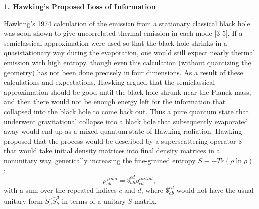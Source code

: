 \vspace{5 mm}
{\bf 1.  Hawking's Proposed Loss of Information}
\vspace{5 mm}

     Hawking's 1974 calculation \cite{Haw74,Haw75} of the emission
from a
stationary classical black hole was soon shown to give uncorrelated
thermal
emission in each mode [3-5].  If a semiclassical
approximation were used so that the black hole shrinks in a
quasistationary way
during the evaporation, one would still expect nearly thermal
emission with
high entropy, though even this calculation (without quantizing the
geometry)
has not been done precisely in four dimensions.  As a result of these
calculations and
expectations, Hawking argued \cite{Haw76} that the semiclassical
approximation
should be good until the black hole shrunk near the Planck mass, and
then there
would not be enough energy left for the information that collapsed
into the
black hole to come back out.  Thus a pure quantum state that
underwent
gravitational collapse into a black hole that subsequently evaporated
away
would end up as a mixed quantum state of Hawking radiation.  Hawking
proposed
that the process would be described by a superscattering operator
$\$$ that
would take initial density matrices into final density matrices in a
nonunitary
way, generically increasing the fine-grained entropy
$S\equiv-Tr(\rho\ln\rho)$:
     	\begin{equation}
	\rho^{final}_{ab}=\$_{ab}^{cd}\rho^{initial}_{cd},
	\end{equation}
with a sum over the repeated indices $c$ and $d$,
where $\$_{ab}^{cd}$ would not have the usual unitary form
$S_a^c\bar{S}_b^d$
in terms of a unitary $S$ matrix.

